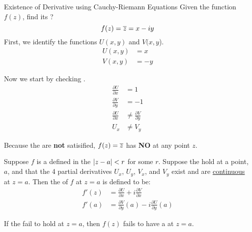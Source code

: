 \begin{example}[Lecture 5]{Existence of Derivative using Cauchy-Riemann Equations}
  Given the function $f(z)$, find its ?
  \begin{equation*}
    f(z) = \overline{z} = x - iy
  \end{equation*}
  \tcblower{}
  First, we identify the functions $U(x, y)$ and $V(x, y$).
  \begin{align*}
    U(x, y) &= x \\
    V(x, y) &= -y
  \end{align*}

  Now we start by checking .
  \begin{align*}
    \frac{\partial U}{\partial x} &= 1 \\
    \frac{\partial V}{\partial y} &= -1 \\
    \frac{\partial U}{\partial x} &\neq \frac{\partial V}{\partial y} \\
    U_{x} &\neq V_{y}
  \end{align*}

  Because the  are \textbf{not} satisified, $f(z) = \overline{z}$ has \textbf{NO}  at any point $z$.
\end{example}

\begin{theorem}\label{thm:Cauchy_Riemann_Complex_Function_Derivative}
  Suppose $f$ is a  defined in the  $\lvert z-a \rvert < r$ for some $r$.
  Suppose the  hold at a point, $a$, and that the 4 partial derivatives $U_{x}$, $U_{y}$, $V_{x}$, and $V_{y}$ exist and are \underline{continuous} at $z=a$.
  Then the  of $f$ at $z=a$ is defined to be:
  \begin{equation}\label{eq:Complex_Function_Derivative-Cauchy_Riemann_Equation_Solution}
    \begin{aligned}
      f'(z) &= \frac{\partial U}{\partial x} + i \frac{\partial V}{\partial x} \\
      f'(a) &= \frac{\partial V}{\partial y}(a) - i \frac{\partial U}{\partial y}(a)
    \end{aligned}
  \end{equation}
\end{theorem}

\begin{remark*}
  If the  fail to hold at $z = a$, then $f(z)$ fails to have a  at $z = a$.
\end{remark*}

